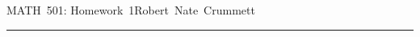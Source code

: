 


\def\reals{I\kern-4pt R}
\def\nats{I\kern-4pt N}
\let\oldexists\exists\def\exists{\oldexists\;}
\let\oldforall\forall\def\forall{\oldforall\,}
\def\qed{\vrule height 6pt width 6pt depth 0pt}
\parindent 0pt
\parskip 2mm


MATH~501: Homework~1\hfill Robert~Nate~Crummett
\smallskip
\hrule




\bye
